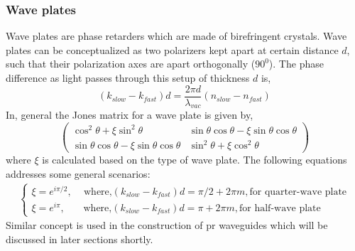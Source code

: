 \documentclass[../report.tex]{subfiles}
\begin{document}
			\subsubsection{Wave plates}
Wave plates are phase retarders which are made of birefringent crystals. Wave plates can be conceptualized as two polarizers kept apart at certain distance $d$, such that their polarization axes are apart orthogonally ($90^{0}$). The phase difference as light passes through this setup of thickness $d$ is,
\begin{equation}\label{eq:jones_matrix_wp1}
\left(k_{slow}-k_{fast}\right)d = \dfrac {2\pi d} {\lambda_{vac} }\left( n_{slow}-n_{fast}\right) 
\end{equation}
In, general the Jones matrix for a wave plate is given by,
\begin{equation}\label{eq:jones_matrix_wp2}
\left( \begin{matrix} 
\cos ^{2}\theta +\xi \sin ^{2}\theta & \sin \theta \cos \theta -\xi \sin \theta \cos \theta\\ 
\sin \theta \cos \theta -\xi \sin \theta \cos \theta & \sin ^{2}\theta +\xi \cos ^{2}\theta
\end{matrix} \right) 
\end{equation}
where $\xi$ is calculated based on the type of wave plate. The following equations addresses some general scenarios:
\begin{equation}\label{eq:jones_matrix_wp3}
\begin{aligned}
\begin{cases} 
\xi = e^{i\pi/2}, \,\quad \text{where,} \left(k_{slow}-k_{fast}\right)d = \pi/2 + 2\pi m, \text{for quarter-wave plate}\\ 
\xi = e^{i\pi},  \;\;\;\quad \text{where,} \left(k_{slow}-k_{fast}\right)d = \pi + 2\pi m, \text{for half-wave plate}
\end{cases}
\end{aligned}
\end{equation}
Similar concept is used in the construction of \gls{pr} waveguides which will be discussed in later sections shortly.
 		
\end{document}
